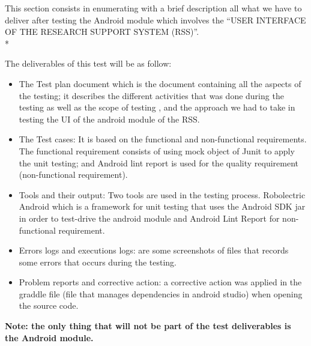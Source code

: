This section consists in enumerating with a brief description all what we have to deliver after testing the Android module which involves the “USER INTERFACE OF THE RESEARCH SUPPORT SYSTEM (RSS)”.  \\*

The deliverables of this test will be as follow:
\begin{itemize}
        \item The Test plan document which is the document containing all the aspects of the testing; it describes the different activities that was done during the testing as well as the scope of testing , and the approach we had to take in testing the UI of the android module of the RSS.
        \item The Test cases: It is based on the functional and non-functional requirements.  The functional requirement consists of using mock object of Junit to apply the unit testing; and Android lint report is used for the quality requirement (non-functional requirement).

        \item Tools and their output: Two tools are used in the testing process. Robolectric Android which is a framework for unit testing that uses the Android SDK jar in order to test-drive the android module and  Android Lint Report for non-functional requirement.

        \item Errors logs and executions logs: are some screenshots of files that records some errors that occurs during the testing.

        \item Problem reports and corrective action: a corrective action was applied in the graddle file (file that manages dependencies in android studio) when opening the source code.     
\end{itemize}


\textbf{Note: the only thing that will not be part of the test deliverables is the Android module.                                                                              }